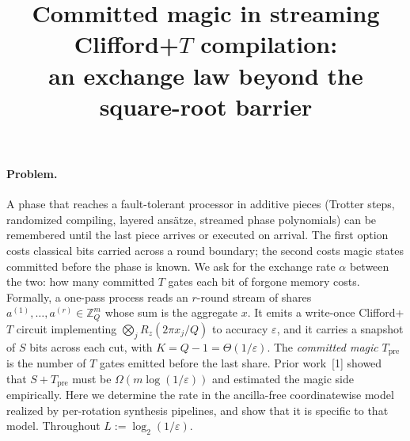 \documentclass[11pt]{article}
\title{\vspace{-1.5em}Committed magic in streaming Clifford+$T$ compilation:\\ an exchange law beyond the square-root barrier}
\author{}
\date{}
\newcommand{\Tpre}{T_{\mathrm{pre}}}
\newcommand{\Z}{\mathbb Z}
\begin{document}
\maketitle
\vspace{-3.5em}

\paragraph{Problem.} A phase that reaches a fault-tolerant processor in additive pieces (Trotter steps, randomized compiling, layered ansätze, streamed phase polynomials) can be remembered until the last piece arrives or executed on arrival. The first option costs classical bits carried across a round boundary; the second costs magic states committed before the phase is known. We ask for the exchange rate $\alpha$ between the two: how many committed $T$ gates each bit of forgone memory costs. Formally, a one-pass process reads an $r$-round stream of shares $a^{(1)},\dots,a^{(r)}\in\Z_Q^m$ whose sum is the aggregate $x$. It emits a write-once Clifford+$T$ circuit implementing $\bigotimes_jR_z(2\pi x_j/Q)$ to accuracy $\varepsilon$, and it carries a snapshot of $S$ bits across each cut, with $K=Q-1=\Theta(1/\varepsilon)$. The \emph{committed magic} $\Tpre$ is the number of $T$ gates emitted before the last share. Prior work~[1] showed that $S+\Tpre$ must be $\Omega(m\log(1/\varepsilon))$ and estimated the magic side empirically. Here we determine the rate in the ancilla-free coordinatewise model realized by per-rotation synthesis pipelines, and show that it is specific to that model. Throughout $L:=\log_2(1/\varepsilon)$.
\end{document}
